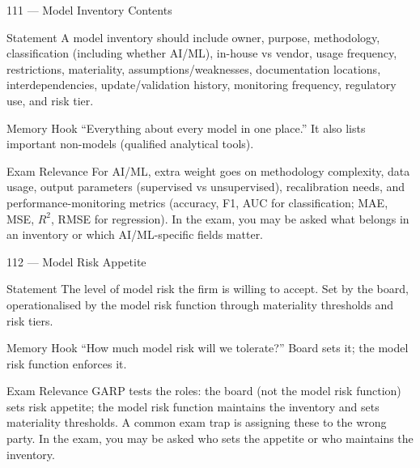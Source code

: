 \documentclass[aspectratio=169,8pt]{beamer}
\begin{document}
	\begin{frame}{111 --- Model Inventory Contents}
		\begin{block}{Statement}
			A model inventory should include owner, purpose, methodology, classification (including whether AI/ML), in-house vs vendor, usage frequency, restrictions, materiality, assumptions/weaknesses, documentation locations, interdependencies, update/validation history, monitoring frequency, regulatory use, and risk tier.
		\end{block}
		\begin{block}{Memory Hook}
			``Everything about every model in one place.'' It also lists important non-models (qualified analytical tools).
		\end{block}
		\begin{block}{Exam Relevance}
			For AI/ML, extra weight goes on methodology complexity, data usage, output parameters (supervised vs unsupervised), recalibration needs, and performance-monitoring metrics (accuracy, F1, AUC for classification; MAE, MSE, $R^2$, RMSE for regression). In the exam, you may be asked what belongs in an inventory or which AI/ML-specific fields matter.
		\end{block}
	\end{frame}
	
	\begin{frame}{112 --- Model Risk Appetite}
		\begin{block}{Statement}
			The level of model risk the firm is willing to accept. Set by the board, operationalised by the model risk function through materiality thresholds and risk tiers.
		\end{block}
		\begin{block}{Memory Hook}
			``How much model risk will we tolerate?'' Board sets it; the model risk function enforces it.
		\end{block}
		\begin{block}{Exam Relevance}
			GARP tests the roles: the board (not the model risk function) sets risk appetite; the model risk function maintains the inventory and sets materiality thresholds. A common exam trap is assigning these to the wrong party. In the exam, you may be asked who sets the appetite or who maintains the inventory.
		\end{block}
	\end{frame}
	
\end{document}
